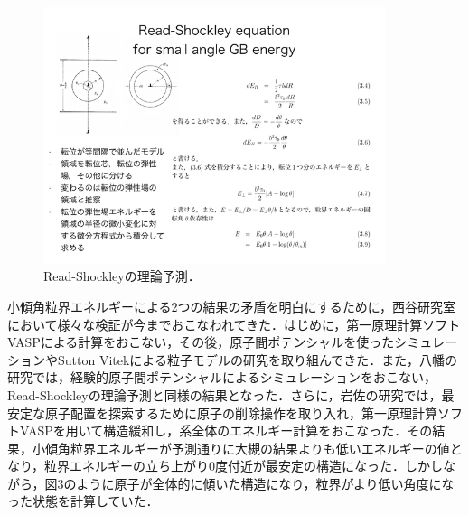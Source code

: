 \begin{figure}[htbp]\begin{center}
\includegraphics[width=10cm,bb= 0 0 737 553]{../figs/./boundary_narita.003.jpeg}
\caption{Read-Shockleyの理論予測．}
\label{default}\end{center}\end{figure}
小傾角粒界エネルギーによる2つの結果の矛盾を明白にするために，西谷研究室において様々な検証が今までおこなわれてきた．はじめに，第一原理計算ソフトVASPによる計算をおこない，その後，原子間ポテンシャルを使ったシミュレーションやSutton Vitekによる粒子モデルの研究を取り組んできた\cite{Murakami}．また，八幡の研究では，経験的原子間ポテンシャルによるシミュレーションをおこない，Read-Shockleyの理論予測と同様の結果となった\cite{Yahata}．さらに，岩佐の研究では，最安定な原子配置を探索するために原子の削除操作を取り入れ，第一原理計算ソフトVASPを用いて構造緩和し，系全体のエネルギー計算をおこなった．その結果，小傾角粒界エネルギーが予測通りに大槻の結果よりも低いエネルギーの値となり，粒界エネルギーの立ち上がり0度付近が最安定の構造になった．しかしながら，図3のように原子が全体的に傾いた構造になり，粒界がより低い角度になった状態を計算していた\cite{Iwasa}．

